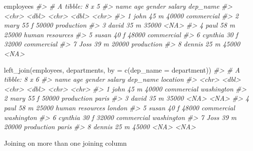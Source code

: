 \documentclass[
]{book}
\newenvironment{Shaded}{\begin{snugshade}}{\end{snugshade}}
\newcommand{\AttributeTok}[1]{\textcolor[rgb]{0.77,0.63,0.00}{#1}}
\newcommand{\CommentTok}[1]{\textcolor[rgb]{0.56,0.35,0.01}{\textit{#1}}}
\newcommand{\FunctionTok}[1]{\textcolor[rgb]{0.00,0.00,0.00}{#1}}
\newcommand{\NormalTok}[1]{#1}
\newcommand{\OtherTok}[1]{\textcolor[rgb]{0.56,0.35,0.01}{#1}}
\newcommand{\StringTok}[1]{\textcolor[rgb]{0.31,0.60,0.02}{#1}}
\begin{document}
\begin{Shaded}
\begin{Highlighting}[]
\NormalTok{employees}
\CommentTok{\#\textgreater{} \# A tibble: 8 x 5}
\CommentTok{\#\textgreater{}   name      age gender salary dep\_name       }
\CommentTok{\#\textgreater{}   \textless{}chr\textgreater{}   \textless{}dbl\textgreater{} \textless{}chr\textgreater{}   \textless{}dbl\textgreater{} \textless{}chr\textgreater{}          }
\CommentTok{\#\textgreater{} 1 john       45 m       40000 commercial     }
\CommentTok{\#\textgreater{} 2 mary       55 f       50000 production     }
\CommentTok{\#\textgreater{} 3 david      35 m       35000 \textless{}NA\textgreater{}           }
\CommentTok{\#\textgreater{} 4 paul       58 m       25000 human resources}
\CommentTok{\#\textgreater{} 5 susan      40 f       48000 commercial     }
\CommentTok{\#\textgreater{} 6 cynthia    30 f       32000 commercial     }
\CommentTok{\#\textgreater{} 7 Joss       39 m       20000 production     }
\CommentTok{\#\textgreater{} 8 dennis     25 m       45000 \textless{}NA\textgreater{}}

\FunctionTok{left\_join}\NormalTok{(employees, departments, }\AttributeTok{by =} \FunctionTok{c}\NormalTok{(}\StringTok{\textquotesingle{}dep\_name\textquotesingle{}} \OtherTok{=} \StringTok{\textquotesingle{}department\textquotesingle{}}\NormalTok{))}
\CommentTok{\#\textgreater{} \# A tibble: 8 x 6}
\CommentTok{\#\textgreater{}   name      age gender salary dep\_name        location  }
\CommentTok{\#\textgreater{}   \textless{}chr\textgreater{}   \textless{}dbl\textgreater{} \textless{}chr\textgreater{}   \textless{}dbl\textgreater{} \textless{}chr\textgreater{}           \textless{}chr\textgreater{}     }
\CommentTok{\#\textgreater{} 1 john       45 m       40000 commercial      washington}
\CommentTok{\#\textgreater{} 2 mary       55 f       50000 production      paris     }
\CommentTok{\#\textgreater{} 3 david      35 m       35000 \textless{}NA\textgreater{}            \textless{}NA\textgreater{}      }
\CommentTok{\#\textgreater{} 4 paul       58 m       25000 human resources london    }
\CommentTok{\#\textgreater{} 5 susan      40 f       48000 commercial      washington}
\CommentTok{\#\textgreater{} 6 cynthia    30 f       32000 commercial      washington}
\CommentTok{\#\textgreater{} 7 Joss       39 m       20000 production      paris     }
\CommentTok{\#\textgreater{} 8 dennis     25 m       45000 \textless{}NA\textgreater{}            \textless{}NA\textgreater{}}
\end{Highlighting}
\end{Shaded}

Joining on more than one joining column
\end{document}
